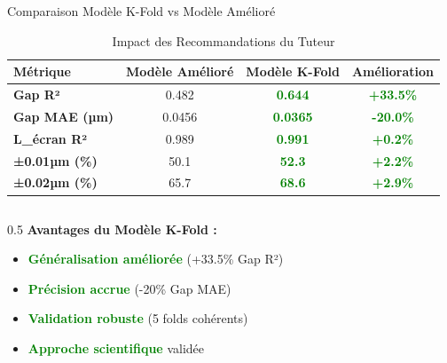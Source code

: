 \documentclass[aspectratio=169]{beamer}
\begin{document}
\begin{frame}{Comparaison Modèle K-Fold vs Modèle Amélioré}
    \begin{table}[h]
        \centering
        \caption{Impact des Recommandations du Tuteur}
        \begin{tabular}{@{}lccc@{}}
            \toprule
            \textbf{Métrique} & \textbf{Modèle Amélioré} & \textbf{Modèle K-Fold} & \textbf{Amélioration} \\
            \midrule
            \textbf{Gap R²} & 0.482 & \textcolor{green}{\textbf{0.644}} & \textcolor{green}{\textbf{+33.5\%}} \\
            \textbf{Gap MAE (µm)} & 0.0456 & \textcolor{green}{\textbf{0.0365}} & \textcolor{green}{\textbf{-20.0\%}} \\
            \textbf{L\_écran R²} & 0.989 & \textcolor{green}{\textbf{0.991}} & \textcolor{green}{\textbf{+0.2\%}} \\
            \textbf{±0.01µm (\%)} & 50.1 & \textcolor{green}{\textbf{52.3}} & \textcolor{green}{\textbf{+2.2\%}} \\
            \textbf{±0.02µm (\%)} & 65.7 & \textcolor{green}{\textbf{68.6}} & \textcolor{green}{\textbf{+2.9\%}} \\
            \bottomrule
        \end{tabular}
    \end{table}

    \vspace{0.3cm}
    \begin{columns}
        \begin{column}{0.5\textwidth}
            \textbf{Avantages du Modèle K-Fold :}
            \begin{itemize}
                \item \textcolor{green}{\textbf{Généralisation améliorée}} (+33.5\% Gap R²)
                \item \textcolor{green}{\textbf{Précision accrue}} (-20\% Gap MAE)
                \item \textcolor{green}{\textbf{Validation robuste}} (5 folds cohérents)
                \item \textcolor{green}{\textbf{Approche scientifique}} validée
            \end{itemize}
        \end{column}

    \end{columns}
\end{frame}
\end{document}
